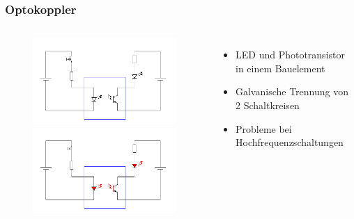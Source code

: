 \begin{frame}
\begin{columns}[c]
\begin{figure}
	\end{figure}
    \end{columns}
\end{frame}

\begin{frame}
    \frametitle{Optokoppler}
    \begin{columns}[c]
        \column[c]{5cm}
        \begin{center}
	\begin{figure}
            \includegraphics[width=1\textwidth, height=.4\textheight, keepaspectratio]{e12/Optokoppler_Aus.png}\\
            \includegraphics[width=1\textwidth, height=.4\textheight, keepaspectratio]{e12/Optokoppler_An.png}
	\end{figure}
        \end{center}
        \column{5cm}
    \begin{itemize}
			\item LED und Phototransistor in einem Bauelement
			\item Galvanische Trennung von 2 Schaltkreisen
			\item Probleme bei Hochfrequenzschaltungen
    \end{itemize}
    \end{columns}
\end{frame}


